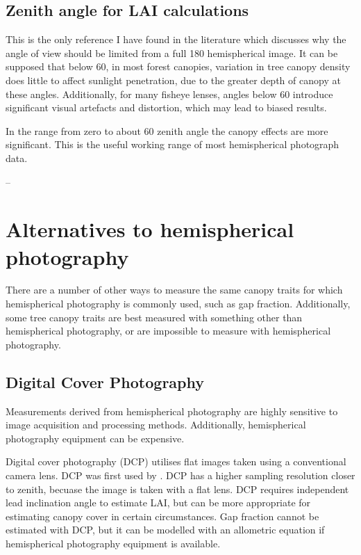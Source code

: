 \documentclass{article}
\begin{document}
\subsection{Zenith angle for LAI calculations} \label{fov}

This is the only reference I have found in the literature which discusses why the angle of view should be limited from a full 180\textdegree{} hemispherical image. It can be supposed that below 60\textdegree{}, in most forest canopies, variation in tree canopy density does little to affect sunlight penetration, due to the greater depth of canopy at these angles. Additionally, for many fisheye lenses, angles below 60\textdegree{} introduce significant visual artefacts and distortion, which may lead to biased results. 

\begin{minipage}{\linewidth}
\begin{framed}
In the range from zero to about 60 zenith angle the canopy effects are more significant. This is the useful working range of most hemispherical photograph data.

-- \citet{Jupp2009}
\end{framed}
\end{minipage}

\section{Alternatives to hemispherical photography}

There are a number of other ways to measure the same canopy traits for which hemispherical photography is commonly used, such as gap fraction. Additionally, some tree canopy traits are best measured with something other than hemispherical photography, or are impossible to measure with hemispherical photography.

\subsection{Digital Cover Photography}

Measurements derived from hemispherical photography are highly sensitive to image acquisition and processing methods. Additionally, hemispherical photography equipment can be expensive.

Digital cover photography (DCP) utilises flat images taken using a conventional camera lens. DCP was first used by \citet{Macfarlane2007a, Macfarlane2007b, Macfarlane2007c}. DCP has a higher sampling resolution closer to zenith, becuase the image is taken with a flat lens. DCP requires independent lead inclination angle to estimate LAI, but can be more appropriate for estimating canopy cover in certain circumstances. Gap fraction cannot be estimated with DCP, but it can be modelled with an allometric equation if hemispherical photography equipment is available.
\end{document}
